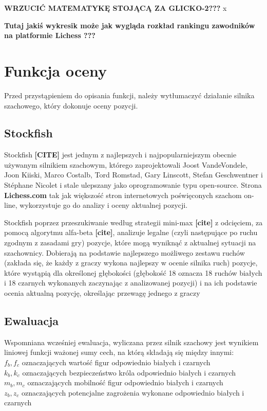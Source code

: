 \documentclass[inzynierska]{pwr_wmat_praca_dyplomowa}
\theoremstyle{plain}
\numberwithin{theorem}{chapter}
\theoremstyle{definition}
\numberwithin{theorem}{chapter}
\begin{document}
\textbf{WRZUCIĆ MATEMATYKĘ STOJĄCĄ ZA GLICKO-2???}
x

\textbf{Tutaj jakiś wykresik może jak wygląda rozkład rankingu zawodników na platformie Lichess ???}
\section{Funkcja oceny}
Przed przystąpieniem do opisania funkcji, należy wytłumaczyć działanie silnika szachowego, który dokonuje oceny pozycji.
\subsection{Stockfish}
Stockfish \textbf{[CITE]} jest jednym z najlepszych i najpopularniejszym obecnie używanym silnikiem szachowym, którego zaprojektowali Joost VandeVondele, Joon Kiiski, Marco Costalb, Tord Romstad, Gary Linscott, Stefan Geschwentner i Stéphane Nicolet i stale ulepszany jako oprogramowanie typu open-source. Strona \textbf{Lichess.com}\cite{stockfish_lichess} tak jak większość stron internetowych poświęconych szachom on-line, wykorzystuje go do analizy i oceny aktualnej pozycji.

Stockfish poprzez przeszukiwanie według strategii mini-max \textbf{[cite]} z odcięciem, za pomocą algorytmu alfa-beta \textbf{[cite]}, analizuje legalne (czyli następujące po ruchu zgodnym z zasadami gry) pozycje, które mogą wyniknąć z aktualnej sytuacji na szachownicy. Dobierają na podstawie najlepszego możliwego zestawu ruchów (zakłada się, że każdy z graczy wykona najlepszy w ocenie silnika ruch) pozycje, które wystąpią dla określonej głębokości (głębokość 18 oznacza 18 ruchów białych i 18 czarnych wykonanych zaczynając z analizowanej pozycji) i na ich podstawie ocenia aktualną pozycję, określając przewagę jednego z graczy

\subsection{Ewaluacja}
Wspomniana wcześniej ewaluacja, wyliczana przez silnik szachowy jest wynikiem liniowej funkcji 
ważonej sumy cech, na którą składają się między innymi:\\
$f_b,f_c$ oznaczających wartość figur odpowiednio białych i czarnych\\
$k_b,k_c$ oznaczających bezpieczeństwo króla odpowiednio białych i czarnych\\
$m_b,m_c$ oznaczających mobilność figur odpowiednio białych i czarnych\\
$z_b,z_c$ oznaczających potencjalne zagrożenia wykonane odpowiednio białych i czarnych\\
\end{document}
